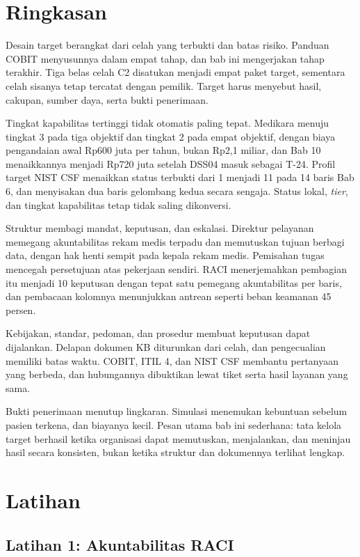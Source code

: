 \section{Ringkasan}

Desain target berangkat dari celah yang terbukti dan batas risiko. Panduan COBIT menyusunnya dalam
empat tahap, dan bab ini mengerjakan tahap terakhir. Tiga belas celah C2 disatukan menjadi empat
paket target, sementara celah sisanya tetap tercatat dengan pemilik. Target harus menyebut hasil,
cakupan, sumber daya, serta bukti penerimaan.

Tingkat kapabilitas tertinggi tidak otomatis paling tepat. Medikara menuju tingkat 3 pada tiga
objektif dan tingkat 2 pada empat objektif, dengan biaya pengandaian awal Rp600 juta per tahun,
bukan Rp2,1 miliar, dan Bab 10 menaikkannya menjadi Rp720 juta setelah DSS04 masuk sebagai T-24.
Profil target NIST CSF menaikkan status terbukti dari 1 menjadi 11 pada 14 baris Bab
6, dan menyisakan dua baris gelombang kedua secara sengaja. Status lokal, \textit{tier}, dan
tingkat kapabilitas tetap tidak saling dikonversi.

Struktur membagi mandat, keputusan, dan eskalasi. Direktur pelayanan memegang akuntabilitas rekam
medis terpadu dan memutuskan tujuan berbagi data, dengan hak henti sempit pada kepala rekam medis.
Pemisahan tugas mencegah persetujuan atas pekerjaan sendiri. RACI menerjemahkan pembagian itu
menjadi 10 keputusan dengan tepat satu pemegang akuntabilitas per baris, dan pembacaan kolomnya
menunjukkan antrean seperti beban keamanan 45 persen.

Kebijakan, standar, pedoman, dan prosedur membuat keputusan dapat dijalankan. Delapan dokumen KB
diturunkan dari celah, dan pengecualian memiliki batas waktu. COBIT, ITIL 4, dan NIST CSF membantu
pertanyaan yang berbeda, dan hubungannya dibuktikan lewat tiket serta hasil layanan yang sama.

Bukti penerimaan menutup lingkaran. Simulasi menemukan kebuntuan sebelum pasien terkena, dan
biayanya kecil. Pesan utama bab ini sederhana: tata kelola target berhasil ketika organisasi dapat
memutuskan, menjalankan, dan meninjau hasil secara konsisten, bukan ketika struktur dan dokumennya
terlihat lengkap.

\section{Latihan}

\subsection*{Latihan 1: Akuntabilitas RACI}

